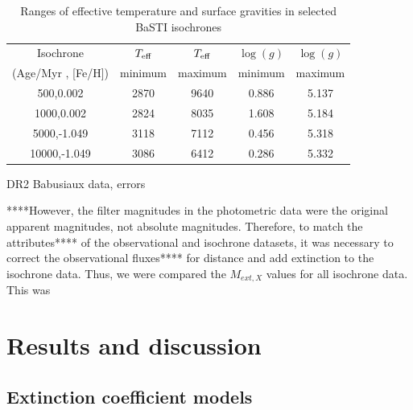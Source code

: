 \documentclass[12pt, a4paper]{report}
\begin{document}
\begin{table}
\begin{center}
\begin{tabular}{ccccc}
\hline
Isochrone & $T_{\textnormal{eff}}$ & $T_{\textnormal{eff}}$ & $\log(g)$ & $\log(g)$ \\
(Age/Myr , [Fe/H]) & minimum & maximum & minimum & maximum \\
\hline
500,0.002 & 2870 & 9640 & 0.886 & 5.137 \\
1000,0.002 & 2824 & 8035 & 1.608 & 5.184 \\
5000,-1.049 & 3118 & 7112 & 0.456 & 5.318 \\
10000,-1.049 & 3086 & 6412 & 0.286 & 5.332 \\
\hline
\end{tabular}
\caption{Ranges of effective temperature and surface gravities in selected BaSTI isochrones}
\label{variable_ranges}
\end{center}
\end{table}

DR2 Babusiaux data, errors

****However, the filter magnitudes in the photometric data were the original apparent magnitudes, not absolute magnitudes. Therefore, to match the attributes**** of the observational and isochrone datasets, it was necessary to correct the observational fluxes**** for distance and add extinction to the isochrone data. Thus, we were compared the $M_{ext,X}$ values for all isochrone data. This was


\chapter{Results and discussion}
\section{Extinction coefficient models} \label{coef_models}
\end{document}
